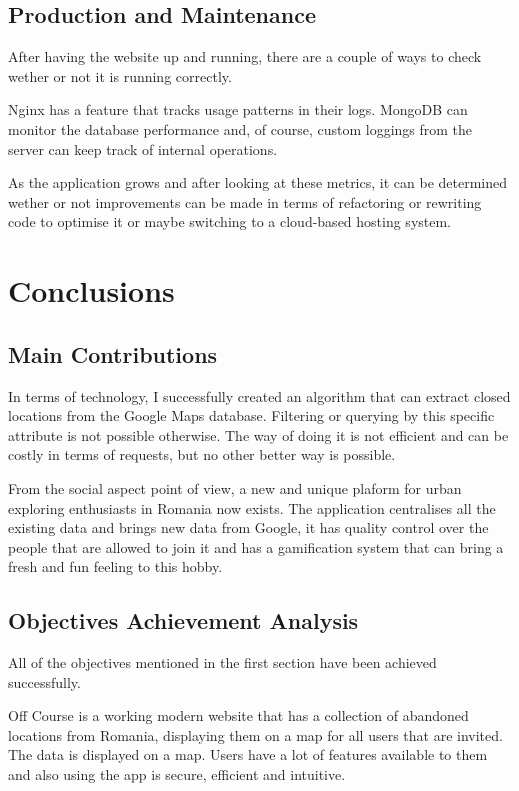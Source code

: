 \documentclass[12pt,a4paper]{report}
\begin{document}
\section{Production and Maintenance}

After having the website up and running, there are a couple of ways to check wether or not it is running correctly. 

Nginx has a feature that tracks usage patterns in their logs. MongoDB can monitor the database performance and, of course, custom loggings from the server can keep track of internal operations.

As the application grows and after looking at these metrics, it can be determined wether or not improvements can be made in terms of refactoring or rewriting code to optimise it or maybe switching to a cloud-based hosting system.

\chapter*{Conclusions}

\section*{Main Contributions}

In terms of technology, I successfully created an algorithm that can extract closed locations from the Google Maps database. Filtering or querying by this specific attribute is not possible otherwise. The way of doing it is not efficient and can be costly in terms of requests, but no other better way is possible.

From the social aspect point of view, a new and unique plaform for urban exploring enthusiasts in Romania now exists. The application centralises all the existing data and brings new data from Google, it has quality control over the people that are allowed to join it and has a gamification system that can bring a fresh and fun feeling to this hobby.

\section*{Objectives Achievement Analysis}

All of the objectives mentioned in the first section have been achieved successfully. 

Off Course is a working modern website that has a collection of abandoned locations from Romania, displaying them on a map for all users that are invited. The data is displayed on a map. Users have a lot of features available to them and also using the app is secure, efficient and intuitive.
\end{document}
